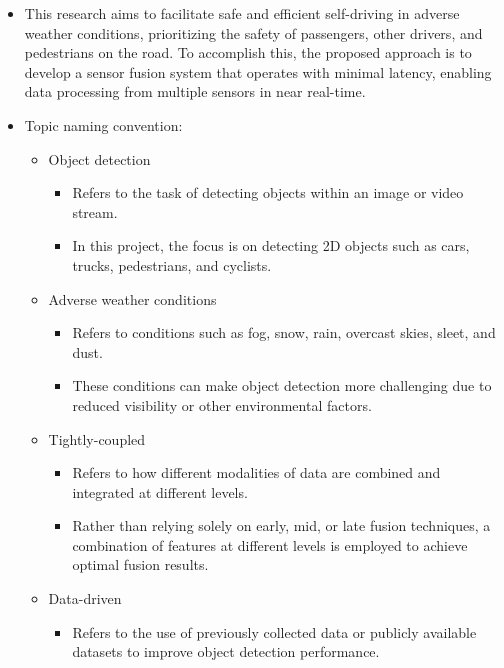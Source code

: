 \documentclass[rnd]{mas_proposal}
\begin{document}
\begin{itemize}
    \item This research aims to facilitate safe and efficient self-driving in adverse weather conditions, prioritizing the safety of passengers, other drivers, and pedestrians on the road. To accomplish this, the proposed approach is to develop a sensor fusion system that operates with minimal latency, enabling data processing from multiple sensors in near real-time.
    
    \newpage

    \item Topic naming convention:
        \begin{itemize}
            \item Object detection
                \begin{itemize}
                    \item Refers to the task of detecting objects within an image or video stream.
                    \item In this project, the focus is on detecting 2D objects such as cars, trucks, pedestrians, and cyclists.
                \end{itemize}
            \item Adverse weather conditions
                \begin{itemize}
                    \item Refers to conditions such as fog, snow, rain, overcast skies, sleet, and dust.
                    \item These conditions can make object detection more challenging due to reduced visibility or other environmental factors.
                \end{itemize}
            \item Tightly-coupled
                \begin{itemize}
                    \item Refers to how different modalities of data are combined and integrated at different levels.
                    \item Rather than relying solely on early, mid, or late fusion techniques, a combination of features at different levels is employed to achieve optimal fusion results.
                \end{itemize}
            \item Data-driven
                \begin{itemize}
                    \item Refers to the use of previously collected data or publicly available datasets to improve object detection performance.

\end{itemize}
\end{itemize}
\end{itemize}
\end{document}
